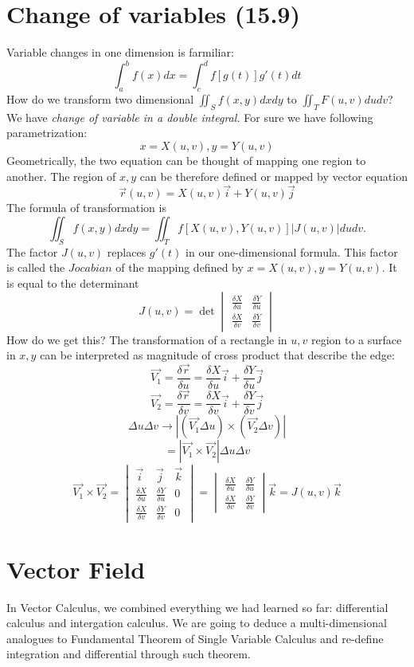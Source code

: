 \documentclass[11pt, oneside]{article}   	%
\begin{document}
\section{Change of variables (15.9)}
Variable changes in one dimension is farmiliar: $$\int_a^b f(x)dx = \int_c^d f[g(t)]g'(t)dt$$
How do we transform two dimensional $\iint_S f(x,y)dxdy$ to $\iint_T F(u,v)dudv$? We have \emph{change of variable in a double integral.} 
For sure we have following parametrization:
$$x = X(u,v), y = Y(u,v)$$
Geometrically, the two equation can be thought of mapping one region to another. The region of $x,y$ can be therefore defined or mapped by vector equation $$\vec{r}(u,v) = X(u,v)\vec{i} + Y(u,v)\vec{j}$$
The formula of transformation is $$\iint_S f(x,y)dxdy = \iint_T f[X(u,v), Y(u,v)]|J(u,v)|dudv.$$The factor $J(u,v)$ replaces $g'(t)$ in our one-dimensional formula. This factor is called the $Jocabian$ of the mapping defined by $x = X(u,v), y = Y(u,v)$. It is equal to the determinant $$J(u,v) = \det{\begin{vmatrix}
   \frac{\delta X}{\delta u} & \frac{\delta Y}{\delta u} \\
   \frac{\delta X}{\delta v} & \frac{\delta Y}{\delta v}
\end{vmatrix}
}$$
How do we get this? The transformation of a rectangle in $u,v$ region to a surface in $x,y$ can be interpreted as magnitude of cross product that describe the edge: 
$$\vec{V_1} = \frac{\delta \vec{r}}{\delta u} = \frac{\delta X}{\delta u}\vec{i} + \frac{\delta Y}{\delta u}\vec{j}$$
$$\vec{V_2} = \frac{\delta \vec{r}}{\delta v} = \frac{\delta X}{\delta v}\vec{i} + \frac{\delta Y}{\delta v}\vec{j}$$
$$\Delta u \Delta v \to |(\vec{V_1} \Delta u) \times (\vec{V_2} \Delta v)|$$
$$= |\vec{V_1} \times \vec{V_2} | \Delta u \Delta v$$
$$\vec{V_1} \times \vec{V_2} = \begin{vmatrix}
  \vec{i}&  \vec{j}& \vec{k} \\
  \frac{\delta X}{\delta u} & \frac{\delta Y}{\delta u}& 0\\
  \frac{\delta X}{\delta v} & \frac{\delta Y}{\delta v} &0
\end{vmatrix}
= \begin{vmatrix}
   \frac{\delta X}{\delta u} & \frac{\delta Y}{\delta u} \\
   \frac{\delta X}{\delta v} & \frac{\delta Y}{\delta v}
\end{vmatrix} \vec{k}
= J(u,v)\vec{k}
$$


\section{Vector Field}
In Vector Calculus, we combined everything we had learned so far: differential calculus and intergation calculus. We are going to deduce a multi-dimensional analogues to Fundamental Theorem of Single Variable Calculus and re-define integration and differential through such theorem.
\end{document}
